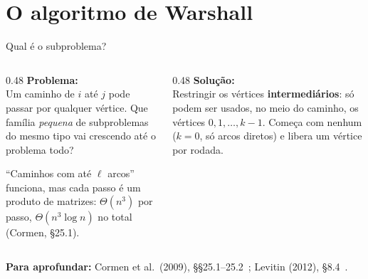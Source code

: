 \documentclass[aspectratio=169,xcolor=table]{beamer}
\newcommand{\fonte}[1]{%
  \vfill
  {\tiny\color{gray!55!black}\textbf{Para aprofundar:} #1\par}%
}
\begin{document}
\section{O algoritmo de Warshall}

\begin{frame}{Qual é o subproblema?}
  \begin{columns}[T]
    \begin{column}{0.48\textwidth}
      \textbf{Problema:}\\[2pt]
      \scriptsize Um caminho de $i$ até $j$ pode passar por qualquer vértice. Que família
      \emph{pequena} de subproblemas do mesmo tipo vai crescendo até o problema todo?
      \medskip

      ``Caminhos com até $\ell$ arcos'' funciona, mas cada passo é um produto de matrizes:
      $\Theta(n^3)$ por passo, $\Theta(n^3\log n)$ no total (Cormen, \S 25.1).
    \end{column}
    \begin{column}{0.48\textwidth}
      \textbf{Solução:}\\[2pt]
      \scriptsize Restringir os vértices \textbf{intermediários}: só podem ser usados, no meio do
      caminho, os vértices $0,1,\dots,k-1$. Começa com nenhum ($k=0$, só arcos diretos) e libera
      um vértice por rodada.
    \end{column}
  \end{columns}
  \medskip
  \begin{center}
  \end{center}
  \fonte{Cormen et al.\ (2009), \S\S 25.1--25.2~\cite{cormen2009introduction};
    Levitin (2012), \S 8.4~\cite{levitin2012introduction}.}
\end{frame}
\end{document}
